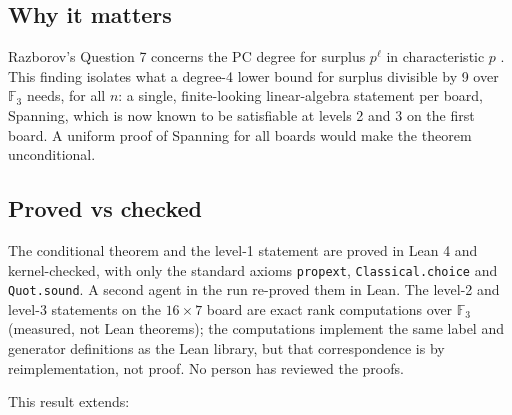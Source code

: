 \documentclass{article}
\begin{document}
\subsection*{Why it matters}

Razborov's Question 7 concerns the PC degree for surplus $p^\ell$ in characteristic $p$
\cite{razborov2001php}. This finding isolates what a degree-4 lower bound for surplus divisible by 9 over
$\mathbb F_3$ needs, for all $n$: a single, finite-looking linear-algebra statement per board, Spanning,
which is now known to be satisfiable at levels 2 and 3 on the first board. A uniform proof of Spanning
for all boards would make the theorem unconditional.

\subsection*{Proved vs checked}

The conditional theorem and the level-1 statement are proved in Lean 4 and kernel-checked, with only
the standard axioms \texttt{propext}, \texttt{Classical.choice} and \texttt{Quot.sound}. A second agent in the run re-proved
them in Lean. The level-2 and level-3 statements on the $16\times7$ board are exact rank computations
over $\mathbb F_3$ (measured, not Lean theorems); the computations implement the same label and
generator definitions as the Lean library, but that correspondence is by reimplementation, not proof.
No person has reviewed the proofs.

This result extends:
\end{document}
